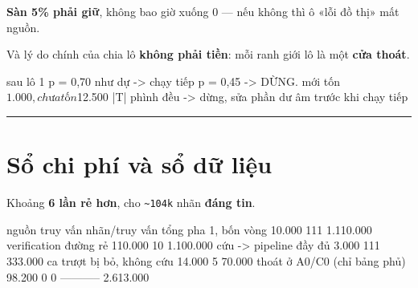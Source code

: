 \documentclass[11pt,a4paper]{article}
\begin{document}
\textbf{Sàn 5\% phải giữ}, không bao giờ xuống 0 — nếu không thì ô «lỗi đồ thị» mất nguồn.

Và lý do chính của chia lô \textbf{không phải tiền}: mỗi ranh giới lô là một \textbf{cửa thoát}.

\begin{dia}
sau lô 1   p = 0,70 như dự  ->  chạy tiếp
           p = 0,45         ->  DỪNG. mới tốn ~$1.000, chưa tốn $12.500
           |T| phình đều    ->  dừng, sửa phần dư âm trước khi chạy tiếp
\end{dia}

\vspace{0.3em}\hrule\vspace{0.6em}

\section{Sổ chi phí và sổ dữ liệu}


Khoảng \textbf{6 lần rẻ hơn}, cho \texttt{\textasciitilde{}104k} nhãn \textbf{đáng tin}.

\begin{dia}
nguồn                                truy vấn    nhãn/truy vấn      tổng
pha 1, bốn vòng                       10.000         111         1.110.000
verification đường rẻ                110.000          10         1.100.000
cứu -> pipeline đầy đủ                 3.000         111           333.000
ca trượt bị bỏ, không cứu             14.000           5            70.000
thoát ở A0/C0 (chỉ bảng phủ)          98.200           0                 0
                                                               -----------
                                                                 2.613.000
\end{dia}
\end{document}
